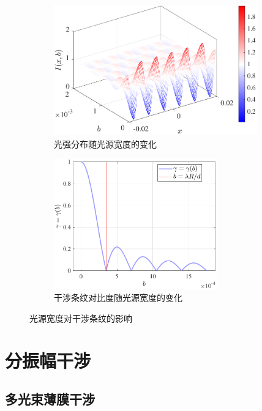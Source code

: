 \documentclass[UTF8]{report}
\theoremstyle{MyLineTheoremStyle} %
\theoremstyle{MyBlockTheoremStyle} %
\theoremstyle{MySubsubsectionStyle} %
\begin{document}
\begin{figure}[H]\centering
\begin{subfigure}[t]{0.5\columnwidth}\centering
    \includegraphics[height=160pt]{assets/3/光强分布.pdf}
    \caption{ 光强分布随光源宽度的变化 }
\end{subfigure}\hfill
\begin{subfigure}[t]{0.5\columnwidth}\centering
    \includegraphics[height=160pt]{assets/3/干涉条纹对比度.pdf}
    \caption{ 干涉条纹对比度随光源宽度的变化 }
\end{subfigure}
\caption{ 光源宽度对干涉条纹的影响 }\label{光源宽度}
\end{figure}

\section{分振幅干涉}

\subsection{多光束薄膜干涉}\label{多光束薄膜干涉}

\end{document}
